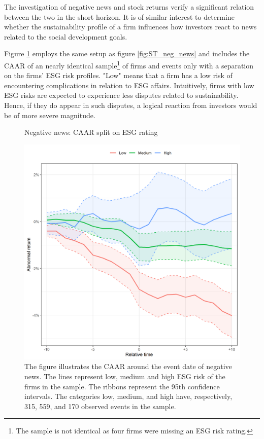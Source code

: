The investigation of negative news and stock returns verify a significant relation between the two in the short horizon. It is of similar interest to determine whether the sustainability profile of a firm influences how investors react to news related to the social development goals. 

Figure \ref{fig:ST_neg_ESG} employs the same setup as figure \ref{fig:ST_neg_news} and includes the CAAR of an nearly identical sample\footnote{The sample is not identical as four firms were missing an ESG risk rating.} of firms and events only with a separation on the firms' ESG risk profiles. "Low" means that a firm has a low risk of encountering complications in relation to ESG affairs. Intuitively, firms with low ESG risks are expected to experience less disputes related to sustainability. Hence, if they do appear in such disputes, a logical reaction from investors would be of more severe magnitude. 

\begin{figure} [H]
    \centering
    \caption{Negative news: CAAR split on ESG rating}
    \includegraphics[scale=0.6]{Projekt/1.Figures analysis/ST_negative_ESG.png}
     \caption*{\footnotesize The figure illustrates the CAAR around the event date of negative news. The lines represent low, medium and high ESG risk of the firms in the sample. The ribbons represent the 95th confidence intervals. The categories low, medium, and high have, respectively, 315, 559, and 170 observed events in the sample. }
    \label{fig:ST_neg_ESG}
\end{figure} 



